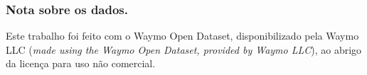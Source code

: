 \subsubsection*{Nota sobre os dados.}
Este trabalho foi feito com o Waymo Open Dataset, disponibilizado pela
Waymo LLC (\emph{made using the Waymo Open Dataset, provided by Waymo
LLC}), ao abrigo da licença para uso não comercial.
